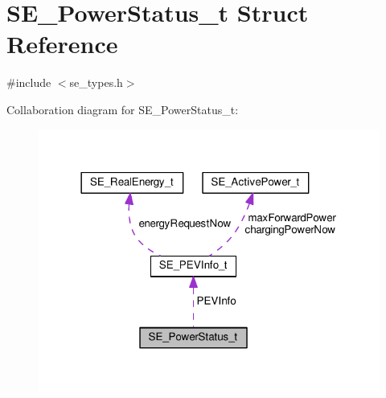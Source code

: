 \hypertarget{structSE__PowerStatus__t}{}\section{S\+E\+\_\+\+Power\+Status\+\_\+t Struct Reference}
\label{structSE__PowerStatus__t}


{\ttfamily \#include $<$se\+\_\+types.\+h$>$}



Collaboration diagram for S\+E\+\_\+\+Power\+Status\+\_\+t\+:\nopagebreak
\begin{figure}[H]
\begin{center}
\leavevmode
\includegraphics[width=318pt]{structSE__PowerStatus__t__coll__graph}
\end{center}
\end{figure}
